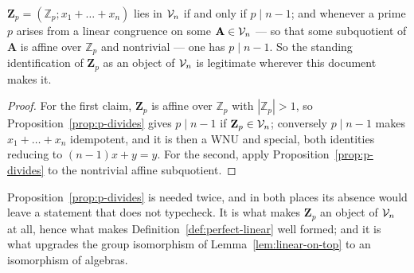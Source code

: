 \begin{corollary}\label{cor:Zp-in-Vn}
$\mathbf Z_{p}=(\mathbb Z_{p};x_{1}+\dots+x_{n})$ lies in $\mathcal V_{n}$ if and only if
$p\mid n-1$; and whenever a prime $p$ arises from a linear congruence on some
$\mathbf A\in\mathcal V_{n}$ --- so that some subquotient of $\mathbf A$ is affine over
$\mathbb Z_{p}$ and nontrivial --- one has $p\mid n-1$. So the standing
identification of $\mathbf Z_{p}$ as an object of $\mathcal V_{n}$ is legitimate wherever
this document makes it.
\end{corollary}

\begin{proof}
For the first claim, $\mathbf Z_{p}$ is affine over $\mathbb Z_{p}$ with
$|\mathbb Z_{p}|>1$, so Proposition~\ref{prop:p-divides} gives $p\mid n-1$ if
$\mathbf Z_{p}\in\mathcal V_{n}$; conversely $p\mid n-1$ makes $x_{1}+\dots+x_{n}$
idempotent, and it is then a WNU and special, both identities reducing to
$(n-1)x+y=y$. For the second, apply
Proposition~\ref{prop:p-divides} to the nontrivial affine subquotient.
\end{proof}

\begin{hazard}\label{haz:p-divides}
Proposition~\ref{prop:p-divides} is needed twice, and in both places its
absence would leave a statement that does not typecheck. It is what makes
$\mathbf Z_{p}$ an object of $\mathcal V_{n}$ at all, hence what makes
Definition~\ref{def:perfect-linear} well formed; and it is what upgrades the
group isomorphism of Lemma~\ref{lem:linear-on-top} to an isomorphism of
algebras.
\end{hazard}
